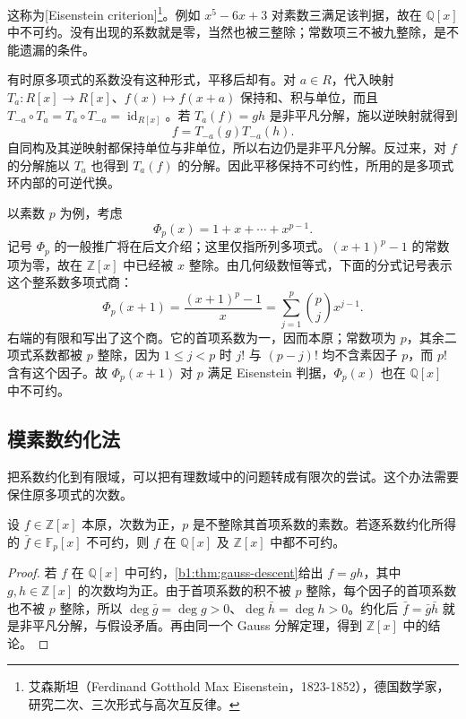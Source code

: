 这称为[Eisenstein criterion]\footnote{艾森斯坦（Ferdinand Gotthold Max Eisenstein，1823-1852），德国数学家，研究二次、三次形式与高次互反律。}。例如 \(x^5-6x+3\) 对素数三满足该判据，故在 \(\mathbb Q[x]\) 中不可约。没有出现的系数就是零，当然也被三整除；常数项三不被九整除，是不能遗漏的条件。

\ProseParagraphBreak
有时原多项式的系数没有这种形式，平移后却有。对 \(a\in R\)，代入映射 \(T_a:R[x]\rightarrow R[x]\)、\(f(x)\mapsto f(x+a)\) 保持和、积与单位，而且 \(T_{-a}\circ T_a=T_a\circ T_{-a}=\operatorname{id}_{R[x]}\)。若 \(T_a(f)=gh\) 是非平凡分解，施以逆映射就得到
\[
	f=T_{-a}(g)T_{-a}(h).
\]
自同构及其逆映射都保持单位与非单位，所以右边仍是非平凡分解。反过来，对 \(f\) 的分解施以 \(T_a\) 也得到 \(T_a(f)\) 的分解。因此平移保持不可约性，所用的是多项式环内部的可逆代换。

\ProseParagraphBreak
以素数 \(p\) 为例，考虑
\[
	\Phi_p(x)=1+x+\cdots+x^{p-1}.
\]
记号 \(\Phi_p\) 的一般推广将在后文介绍；这里仅指所列多项式。\((x+1)^p-1\) 的常数项为零，故在 \(\mathbb Z[x]\) 中已经被 \(x\) 整除。由几何级数恒等式，下面的分式记号表示这个整系数多项式商：
\[
	\Phi_p(x+1)=\frac{(x+1)^p-1}{x} =\sum_{j=1}^p\binom pj x^{j-1}.
\]
右端的有限和写出了这个商。它的首项系数为一，因而本原；常数项为 \(p\)，其余二项式系数都被 \(p\) 整除，因为 \(1\le j<p\) 时 \(j!\) 与 \((p-j)!\) 均不含素因子 \(p\)，而 \(p!\) 含有这个因子。故 \(\Phi_p(x+1)\) 对 \(p\) 满足 Eisenstein 判据，\(\Phi_p(x)\) 也在 \(\mathbb Q[x]\) 中不可约。

\subsection{模素数约化法}
\label{b1:subsec:1203:02}

把系数约化到有限域，可以把有理数域中的问题转成有限次的尝试。这个办法需要保住原多项式的次数。

\begin{proposition}\label{b1:prop:reduction-irreducible}
	设 \(f\in\mathbb Z[x]\) 本原，次数为正，\(p\) 是不整除其首项系数的素数。若逐系数约化所得的 \(\bar f\in\mathbb F_p[x]\) 不可约，则 \(f\) 在 \(\mathbb Q[x]\) 及 \(\mathbb Z[x]\) 中都不可约。
\end{proposition}
\begin{proof}
	若 \(f\) 在 \(\mathbb Q[x]\) 中可约，\cref{b1:thm:gauss-descent}给出 \(f=gh\)，其中 \(g,h\in\mathbb Z[x]\) 的次数均为正。由于首项系数的积不被 \(p\) 整除，每个因子的首项系数也不被 \(p\) 整除，所以 \(\deg\bar g=\deg g>0\)、\(\deg\bar h=\deg h>0\)。约化后 \(\bar f=\bar g\bar h\) 就是非平凡分解，与假设矛盾。再由同一个 Gauss 分解定理，得到 \(\mathbb Z[x]\) 中的结论。
\end{proof}

